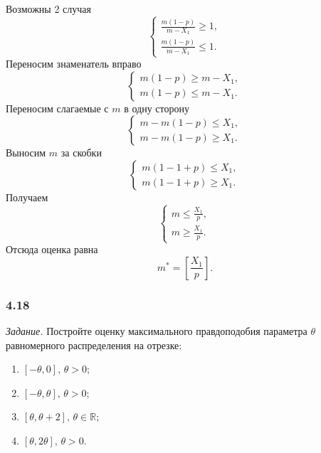 \begin{enumerate}[label=\alph*)]
  Возможны 2 случая
  $$ \begin{cases}
    \frac{m \left( 1 - p \right) }{m - X_1} \geq 1, \\
    \frac{m \left( 1 - p \right) }{m - X_1} \leq 1.
  \end{cases}$$
  Переносим знаменатель вправо
  $$ \begin{cases}
    m \left( 1 - p \right) \geq m - X_1, \\
    m \left( 1 - p \right) \leq m - X_1.
  \end{cases}$$
  Переносим слагаемые с $m$ в одну сторону
  $$ \begin{cases}
    m - m \left( 1 - p \right) \leq X_1, \\
    m - m \left( 1 - p \right) \geq X_1.
  \end{cases}$$
  Выносим $m$ за скобки
  $$ \begin{cases}
    m \left( 1 - 1 + p \right) \leq X_1, \\
    m \left( 1 - 1 + p \right) \geq X_1.
  \end{cases}$$
  Получаем
  $$ \begin{cases}
    m \leq \frac{X_1}{p}, \\
    m \geq \frac{X_1}{p}.
  \end{cases}$$
  Отсюда оценка равна
  $$m^* =
    \left[ \frac{X_1}{p} \right].$$
\end{enumerate}

\subsubsection*{4.18}

\textit{Задание.}
Постройте оценку максимального правдоподобия параметра $ \theta $
равномерного распределения на отрезке:
\begin{enumerate}[label=\alph*)]
  \item $ \left[- \theta, 0 \right], \, \theta > 0$;
  \item $ \left[- \theta, \theta \right], \, \theta > 0$;
  \item $ \left[ \theta , \theta + 2 \right], \, \theta \in \mathbb{R}$;
  \item $ \left[ \theta, 2 \theta \right], \, \theta > 0$.
\end{enumerate}

